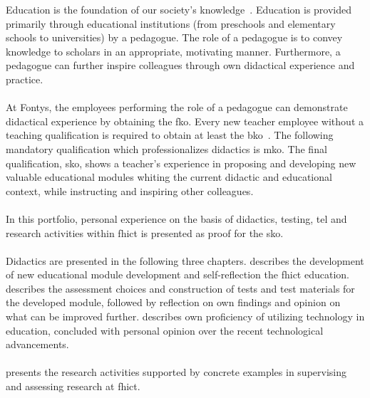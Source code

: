 Education is the foundation of our society's knowledge~\cite{FKO}.
Education is provided primarily through educational institutions (from preschools and elementary schools to universities) by a pedagogue. 
The role of a pedagogue is to convey knowledge to scholars in an appropriate, motivating manner. 
Furthermore, a pedagogue can further inspire colleagues through own didactical experience and practice.
\\\\
At Fontys, the employees performing the role of a pedagogue can demonstrate didactical experience by obtaining the \acrfull{fko}. 
Every new teacher employee without a teaching qualification is required to obtain at least the \acrfull{bko}~\cite{FKO}.
The following mandatory qualification which professionalizes didactics is \acrfull{mko}. The final qualification, \acrfull{sko}, shows a teacher's experience in proposing and developing new valuable educational modules whiting the current didactic and educational context, while instructing and inspiring other colleagues.
\\\\
In this portfolio, personal experience on the basis of didactics, testing, \acrfull{tel} and research activities within \acrfull{fhict} is presented as proof for the \acrshort{sko}.
\\\\
Didactics are presented in the following three chapters.
 describes the  development of new educational module development  and  self-reflection
the \acrshort{fhict} education.
 describes the assessment choices and construction of tests and test materials for the developed module, followed by reflection on own findings and opinion on what can be improved further. 
 describes own proficiency of utilizing technology in education, concluded with personal opinion over the recent technological advancements.
\\\\
 presents the research activities supported by concrete examples in supervising and assessing research at \acrshort{fhict}. 

